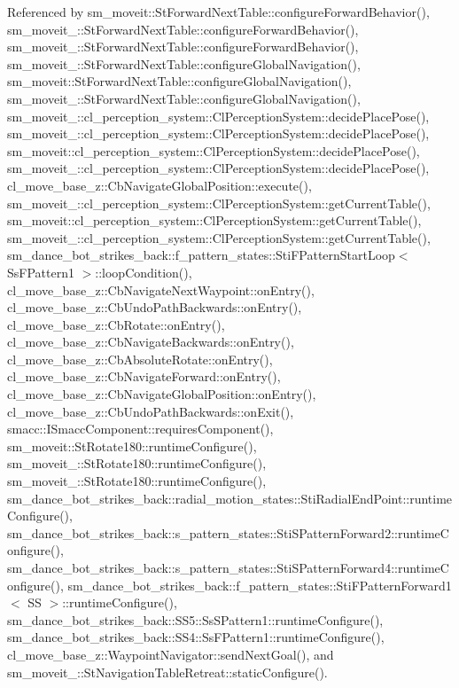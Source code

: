 Referenced by sm\+\_\+moveit\+::\+St\+Forward\+Next\+Table\+::configure\+Forward\+Behavior(), sm\+\_\+moveit\+\_\+::\+St\+Forward\+Next\+Table\+::configure\+Forward\+Behavior(), sm\+\_\+moveit\+\_\+::\+St\+Forward\+Next\+Table\+::configure\+Forward\+Behavior(), sm\+\_\+moveit\+\_\+::\+St\+Forward\+Next\+Table\+::configure\+Global\+Navigation(), sm\+\_\+moveit\+::\+St\+Forward\+Next\+Table\+::configure\+Global\+Navigation(), sm\+\_\+moveit\+\_\+::\+St\+Forward\+Next\+Table\+::configure\+Global\+Navigation(), sm\+\_\+moveit\+\_\+::cl\+\_\+perception\+\_\+system\+::\+Cl\+Perception\+System\+::decide\+Place\+Pose(), sm\+\_\+moveit\+\_\+::cl\+\_\+perception\+\_\+system\+::\+Cl\+Perception\+System\+::decide\+Place\+Pose(), sm\+\_\+moveit\+::cl\+\_\+perception\+\_\+system\+::\+Cl\+Perception\+System\+::decide\+Place\+Pose(), sm\+\_\+moveit\+\_\+::cl\+\_\+perception\+\_\+system\+::\+Cl\+Perception\+System\+::decide\+Place\+Pose(), cl\+\_\+move\+\_\+base\+\_\+z\+::\+Cb\+Navigate\+Global\+Position\+::execute(), sm\+\_\+moveit\+\_\+::cl\+\_\+perception\+\_\+system\+::\+Cl\+Perception\+System\+::get\+Current\+Table(), sm\+\_\+moveit\+::cl\+\_\+perception\+\_\+system\+::\+Cl\+Perception\+System\+::get\+Current\+Table(), sm\+\_\+moveit\+\_\+::cl\+\_\+perception\+\_\+system\+::\+Cl\+Perception\+System\+::get\+Current\+Table(), sm\+\_\+dance\+\_\+bot\+\_\+strikes\+\_\+back\+::f\+\_\+pattern\+\_\+states\+::\+Sti\+F\+Pattern\+Start\+Loop$<$ Ss\+F\+Pattern1 $>$\+::loop\+Condition(), cl\+\_\+move\+\_\+base\+\_\+z\+::\+Cb\+Navigate\+Next\+Waypoint\+::on\+Entry(), cl\+\_\+move\+\_\+base\+\_\+z\+::\+Cb\+Undo\+Path\+Backwards\+::on\+Entry(), cl\+\_\+move\+\_\+base\+\_\+z\+::\+Cb\+Rotate\+::on\+Entry(), cl\+\_\+move\+\_\+base\+\_\+z\+::\+Cb\+Navigate\+Backwards\+::on\+Entry(), cl\+\_\+move\+\_\+base\+\_\+z\+::\+Cb\+Absolute\+Rotate\+::on\+Entry(), cl\+\_\+move\+\_\+base\+\_\+z\+::\+Cb\+Navigate\+Forward\+::on\+Entry(), cl\+\_\+move\+\_\+base\+\_\+z\+::\+Cb\+Navigate\+Global\+Position\+::on\+Entry(), cl\+\_\+move\+\_\+base\+\_\+z\+::\+Cb\+Undo\+Path\+Backwards\+::on\+Exit(), smacc\+::\+I\+Smacc\+Component\+::requires\+Component(), sm\+\_\+moveit\+::\+St\+Rotate180\+::runtime\+Configure(), sm\+\_\+moveit\+\_\+::\+St\+Rotate180\+::runtime\+Configure(), sm\+\_\+moveit\+\_\+::\+St\+Rotate180\+::runtime\+Configure(), sm\+\_\+dance\+\_\+bot\+\_\+strikes\+\_\+back\+::radial\+\_\+motion\+\_\+states\+::\+Sti\+Radial\+End\+Point\+::runtime\+Configure(), sm\+\_\+dance\+\_\+bot\+\_\+strikes\+\_\+back\+::s\+\_\+pattern\+\_\+states\+::\+Sti\+S\+Pattern\+Forward2\+::runtime\+Configure(), sm\+\_\+dance\+\_\+bot\+\_\+strikes\+\_\+back\+::s\+\_\+pattern\+\_\+states\+::\+Sti\+S\+Pattern\+Forward4\+::runtime\+Configure(), sm\+\_\+dance\+\_\+bot\+\_\+strikes\+\_\+back\+::f\+\_\+pattern\+\_\+states\+::\+Sti\+F\+Pattern\+Forward1$<$ S\+S $>$\+::runtime\+Configure(), sm\+\_\+dance\+\_\+bot\+\_\+strikes\+\_\+back\+::\+S\+S5\+::\+Ss\+S\+Pattern1\+::runtime\+Configure(), sm\+\_\+dance\+\_\+bot\+\_\+strikes\+\_\+back\+::\+S\+S4\+::\+Ss\+F\+Pattern1\+::runtime\+Configure(), cl\+\_\+move\+\_\+base\+\_\+z\+::\+Waypoint\+Navigator\+::send\+Next\+Goal(), and sm\+\_\+moveit\+\_\+::\+St\+Navigation\+Table\+Retreat\+::static\+Configure().


